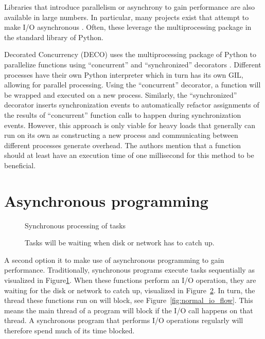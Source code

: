 Libraries that introduce parallelism or asynchrony to gain performance are also available in large numbers.
In particular, many projects exist that attempt to make I/O asynchronous \cite{asyncio2016python}.
Often, these leverage the multiprocessing package in the standard library of Python.

Decorated Concurrency (DECO) uses the multiprocessing package of Python to parallelize functions using  \enquote{concurrent} and \enquote{synchronized} decorators \cite{sherman2016deco}.
Different processes have their own Python interpreter which in turn has its own GIL, allowing for parallel processing.
Using the \enquote{concurrent} decorator, a function will be wrapped and executed on a new process.
Similarly, the \enquote{synchronized} decorator  inserts synchronization events to automatically refactor assignments of the results of \enquote{concurrent} function calls to happen during synchronization events.
However, this approach is only viable for heavy loads that generally can run on its own as constructing a new process and communicating between different processes generate overhead.
The authors mention that a function should at least have an execution time of one millisecond for this method to be beneficial.

\section{Asynchronous programming}

\begin{figure}[!h]
	\caption{Synchronous processing of tasks}
	\label{fig:normal_execution_flow}
\end{figure}

\begin{figure}[h]
	\caption{Tasks will be waiting when disk or network has to catch up.}
	\label{fig:delays_in_execution}
\end{figure}

A second option it to make use of asynchronous programming to gain performance.
Traditionally, synchronous programs execute tasks sequentially as visualized in Figure\ref{fig:normal_execution_flow}.
When these functions perform an I/O operation, they are waiting for the disk or network to catch up, visualized in Figure~\ref{fig:delays_in_execution}.
In turn, the thread these functions run on will block, see Figure~\ref{fig:normal_io_flow}.
This means the main thread of a program will block if the I/O call happens on that thread.
A synchronous program that performs I/O operations regularly will therefore spend much of its time blocked.

